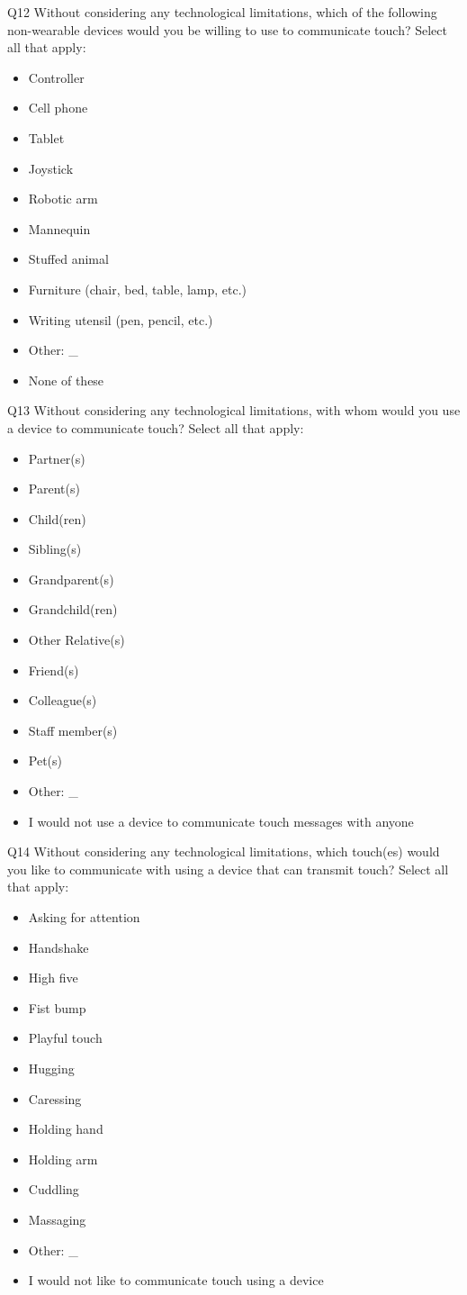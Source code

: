 \documentclass[acmsmall]{acmart}
\begin{document}
Q12 Without considering any technological limitations, which of the following non-wearable devices would you be willing to use to communicate touch? 
Select all that apply:
\begin{itemize}
\item Controller  
\item Cell phone 
\item Tablet  
\item Joystick  
\item Robotic arm  
\item Mannequin  
\item Stuffed animal  
\item Furniture (chair, bed, table, lamp, etc.)  
\item Writing utensil (pen, pencil, etc.) 
\item Other:  \_
\item None of these 
\end{itemize}

Q13 Without considering any technological limitations, with whom would you use a device to communicate touch? 
Select all that apply:
\begin{itemize}
\item Partner(s) 
\item Parent(s) 
\item Child(ren)  
\item Sibling(s)  
\item Grandparent(s) 
\item Grandchild(ren)  
\item Other Relative(s)  
\item Friend(s)  
\item Colleague(s)  
\item Staff member(s)  
\item Pet(s)  
\item Other: \_
\item I would not use a device to communicate touch messages with anyone 
\end{itemize}

Q14 Without considering any technological limitations, which touch(es) would you like to communicate with using a device that can transmit touch? 
Select all that apply:
\begin{itemize}
\item Asking for attention 
\item Handshake  
\item High five  
\item Fist bump  
\item Playful touch  
\item Hugging  
\item Caressing  
\item Holding hand  
\item Holding arm  
\item Cuddling  
\item Massaging  
\item Other:  \_
\item I would not like to communicate touch using a device  
\end{itemize}
\end{document}
